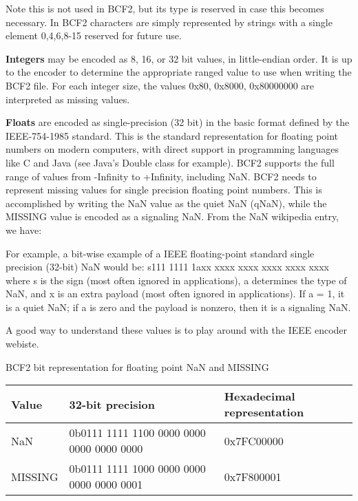 \documentclass[8pt]{article}
\begin{document}
Note this is not used in BCF2, but its type is reserved in case this becomes necessary.  In BCF2 characters are simply represented by strings with a single element 0,4,6,8-15 reserved for future use.

\vspace{0.3cm}

\textbf{Integers} may be encoded as 8, 16, or 32 bit values, in little-endian order.  It is up to the encoder to determine the appropriate ranged value to use when writing the BCF2 file.  For each integer size, the values 0x80, 0x8000, 0x80000000 are interpreted as missing values.

\vspace{0.3cm}
\textbf{Floats} are encoded as single-precision (32 bit) in the basic format defined by the IEEE-754-1985 standard.  This is the standard representation for floating point numbers on modern computers, with direct support in programming languages like C and Java (see Java's Double class for example).  BCF2 supports the full range of values from -Infinity to +Infinity, including NaN.  BCF2 needs to represent missing values for single precision floating point numbers.  This is accomplished by writing the NaN value as the quiet NaN (qNaN), while the MISSING value is encoded as a signaling NaN.  From the NaN wikipedia entry, we have:

For example, a bit-wise example of a IEEE floating-point standard single precision (32-bit) NaN would be:
s111 1111 1axx xxxx xxxx xxxx xxxx xxxx where s is the sign (most often ignored in applications), a determines the type of NaN, and x
is an extra payload (most often ignored in applications).  If a = 1, it is a quiet NaN; if a is zero and the payload is nonzero, then it is a
signaling NaN.

A good way to understand these values is to play around with the IEEE encoder webiste.

\vspace{0.3cm}
BCF2 bit representation for floating point NaN and MISSING

\vspace{0.1cm}
\begin{tabular}{| l | l | l |} \hline
Value & 32-bit precision & Hexadecimal representation \\ \hline
NaN	& 0b0111 1111 1100 0000 0000 0000 0000 0000 & 0x7FC00000 \\ \hline
MISSING &	0b0111 1111 1000 0000 0000 0000 0000 0001 & 0x7F800001 \\ \hline
\end{tabular}
\end{document}
